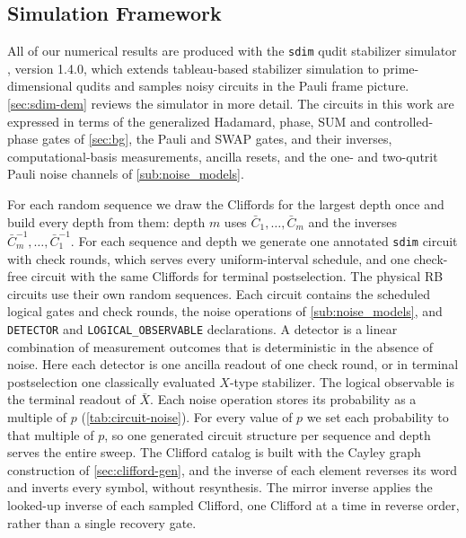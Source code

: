 \subsection{Simulation Framework}
\label{sub:sim_framework}

All of our numerical results are produced with the \texttt{sdim} qudit stabilizer simulator \cite{sdim}, version 1.4.0, which extends tableau-based stabilizer simulation to prime-dimensional qudits and samples noisy circuits in the Pauli frame picture. \autoref{sec:sdim-dem} reviews the simulator in more detail. The circuits in this work are expressed in terms of the generalized Hadamard, phase, SUM and controlled-phase gates of \autoref{sec:bg}, the Pauli and SWAP gates, and their inverses, computational-basis measurements, ancilla resets, and the one- and two-qutrit Pauli noise channels of \autoref{sub:noise_models}.

For each random sequence we draw the Cliffords for the largest depth once and build every depth from them: depth $m$ uses $\bar C_1, \dots, \bar C_m$ and the inverses $\bar C_m^{-1}, \dots, \bar C_1^{-1}$. For each sequence and depth we generate one annotated \texttt{sdim} circuit with check rounds, which serves every uniform-interval schedule, and one check-free circuit with the same Cliffords for terminal postselection. The physical RB circuits use their own random sequences. Each circuit contains the scheduled logical gates and check rounds, the noise operations of \autoref{sub:noise_models}, and \texttt{DETECTOR} and \texttt{LOGICAL\_OBSERVABLE} declarations. A detector is a linear combination of measurement outcomes that is deterministic in the absence of noise. Here each detector is one ancilla readout of one check round, or in terminal postselection one classically evaluated $X$-type stabilizer. The logical observable is the terminal readout of $\bar X$. Each noise operation stores its probability as a multiple of $p$ (\autoref{tab:circuit-noise}). For every value of $p$ we set each probability to that multiple of $p$, so one generated circuit structure per sequence and depth serves the entire sweep. The Clifford catalog is built with the Cayley graph construction of \autoref{sec:clifford-gen}, and the inverse of each element reverses its word and inverts every symbol, without resynthesis. The mirror inverse applies the looked-up inverse of each sampled Clifford, one Clifford at a time in reverse order, rather than a single recovery gate.


